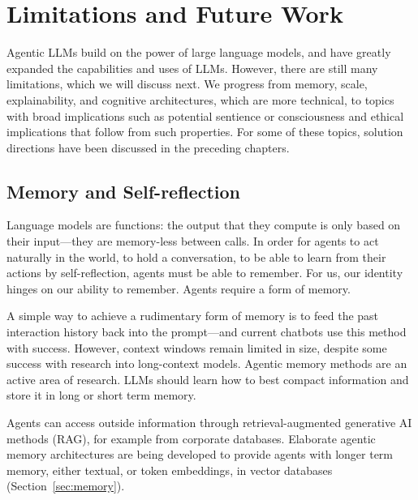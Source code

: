 \section{Limitations and Future Work}\label{sec:limitations}
Agentic LLMs build on the power of large language models, and have greatly expanded the capabilities and uses of LLMs. However, there are still many limitations, which we will discuss next.
We progress from memory, scale, explainability, and cognitive architectures, which are more technical, to topics with broad implications such as potential sentience or consciousness and ethical implications that follow from such properties. For some of these topics, solution directions have been discussed in the preceding chapters. 

\subsection{Memory and Self-reflection}
Language models are functions: the output that they compute is only  based on their input---they are memory-less between calls. In order for agents to act naturally in the world, to hold a conversation, to be able to learn from their actions by self-reflection, agents must be able to remember. For us, our identity hinges on our ability to remember. Agents require a form of memory.

A simple way to achieve a rudimentary form of memory is  to feed the past interaction history back into the prompt---and current chatbots use this method with success. However, context windows remain limited in size, despite some success with research  into long-context models. Agentic memory methods are an active area of research. LLMs should learn how to best compact information and store it in long or short term memory.

Agents can access outside information through retrieval-augmented generative AI methods (RAG), for example from corporate databases. 
Elaborate agentic memory architectures are being developed to provide agents with longer term memory, either textual, or token embeddings, in vector databases  (Section~\ref{sec:memory}). 


